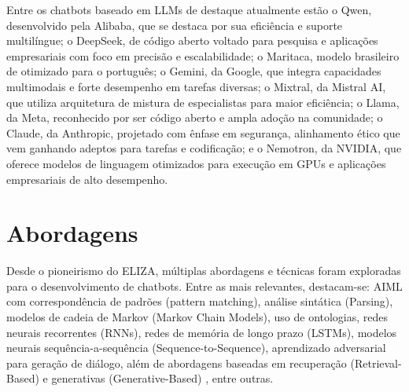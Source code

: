 \documentclass[14pt,a4paper,oneside]{book}
\begin{document}
Entre os chatbots baseado em LLMs de destaque atualmente estão o Qwen, desenvolvido pela Alibaba, que se destaca por sua eficiência e suporte multilíngue; o DeepSeek, de código aberto voltado para pesquisa e aplicações empresariais com foco em precisão e escalabilidade; o Maritaca, modelo brasileiro de otimizado para o português; o Gemini, da Google, que integra capacidades multimodais e forte desempenho em tarefas diversas; o Mixtral, da Mistral AI, que utiliza arquitetura de mistura de especialistas para maior eficiência; o Llama, da Meta, reconhecido por ser código aberto e ampla adoção na comunidade; o Claude, da Anthropic, projetado com ênfase em segurança, alinhamento ético que vem ganhando adeptos para tarefas e codificação; e o Nemotron, da NVIDIA, que oferece modelos de linguagem otimizados para execução em GPUs e aplicações empresariais de alto desempenho. 

\section{Abordagens}

Desde o pioneirismo do ELIZA, múltiplas abordagens e técnicas foram exploradas para o desenvolvimento de chatbots. 
Entre as mais relevantes, destacam-se: AIML com correspondência de padrões (pattern matching), análise sintática (Parsing), modelos de cadeia de Markov (Markov Chain Models), uso de ontologias, redes neurais recorrentes (RNNs), redes de memória de longo prazo (LSTMs), modelos neurais sequência-a-sequência (Sequence-to-Sequence), aprendizado adversarial para geração de diálogo, além de abordagens baseadas em recuperação (Retrieval-Based) e generativas (Generative-Based) \cite{Borah2019, Ramesh2019, Shaikh2016, Abdul-Kader2015, Li2018}, entre outras.
\end{document}
